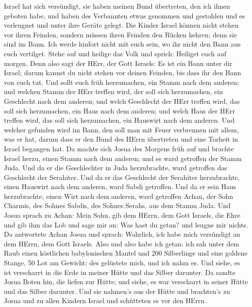  Israel hat sich versündigt, sie haben meinen Bund
übertreten, den ich ihnen geboten habe, und haben des Verbannten etwas
genommen und gestohlen und es verleugnet und unter ihre Geräte gelegt.
 Die Kinder Israel können nicht stehen vor ihren Feinden,
sondern müssen ihren Feinden den Rücken kehren; denn sie sind im Bann.
Ich werde hinfort nicht mit euch sein, wo ihr nicht den Bann aus euch
vertilget.  Stehe auf und heilige das Volk und sprich:
Heiliget euch auf morgen. Denn also sagt der HErr, der Gott Israels: Es
ist ein Bann unter dir Israel; darum kannst du nicht stehen vor deinen
Feinden, bis dass ihr den Bann von euch tut.  Und sollt
euch früh herzumachen, ein Stamm nach dem anderen; und welchen Stamm der
HErr treffen wird, der soll sich herzumachen, ein Geschlecht nach dem
anderen; und welch Geschlecht der HErr treffen wird, das soll sich
herzumachen, ein Haus nach dem anderen; und welch Haus der HErr treffen
wird, das soll sich herzumachen, ein Hauswirt nach dem anderen.
 Und welcher gefunden wird im Bann, den soll man mit Feuer
verbrennen mit allem, was er hat, darum dass er den Bund des HErrn
übertreten und eine Torheit in Israel begangen hat.  Da
machte sich Josua des Morgens früh auf und brachte Israel herzu, einen
Stamm nach dem anderen; und es ward getroffen der Stamm Juda.
 Und da er die Geschlechter in Juda herzubrachte, ward
getroffen das Geschlecht der Serahiter. Und da er das Geschlecht der
Serahiter herzubrachte, einen Hauswirt nach dem anderen, ward Sabdi
getroffen.  Und da er sein Haus herzubrachte, einen Wirt
nach dem anderen, ward getroffen Achan, der Sohn Charmis, des Sohnes
Sabdis, des Sohnes Serahs, aus dem Stamm Juda.  Und Josua
sprach zu Achan: Mein Sohn, gib dem HErrn, dem Gott Israels, die Ehre
und gib ihm das Lob und sage mir an: Was hast du getan? und leugne mir
nichts.  Da antwortete Achan Josua und sprach: Wahrlich,
ich habe mich versündigt an dem HErrn, dem Gott Israels. Also und also
habe ich getan:  ich sah unter dem Raub einen köstlichen
babylonischen Mantel und 200 Silberlinge und eine goldene Stange, 50 Lot
am Gewicht; des gelüstete mich, und ich nahm es. Und siehe, es ist
verscharrt in die Erde in meiner Hütte und das Silber darunter.
 Da sandte Josua Boten hin, die liefen zur Hütte; und
siehe, es war verscharrt in seiner Hütte und das Silber darunter.
 Und sie nahmen's aus der Hütte und brachten's zu Josua und
zu allen Kindern Israel und schütteten es vor den HErrn. 

